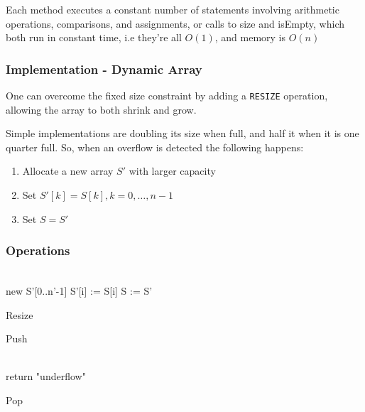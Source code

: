 				\par{Each method executes a constant number of statements involving
arithmetic operations, comparisons, and assignments, or calls to size and isEmpty,
which both run in constant time, i.e they're all $O(1)$, and memory is $O(n)$}

		\subsubsection{Implementation - Dynamic Array}

				\par{One can overcome the fixed size constraint by adding a \texttt{RESIZE} operation, allowing the array to both shrink and grow.}
				\par{Simple implementations are doubling its size when full, and half it when it is one quarter full. So, when an overflow is detected the following happens:}
				\begin{enumerate}
						\item Allocate a new array $S'$ with larger capacity
						\item Set $S'[k] = S[k] , k = 0 , \dots , n-1$
						\item Set $S = S'$
				\end{enumerate}

		\subsubsection{Operations}
						\begin{algorithm}[H]
				\DontPrintSemicolon
				\SetAlgoLined{}
				\\
				\Indp new S’[0..n’-1] \;
					{S’[i] := S[i]}
				S := S'
				\caption{Resize}

			\end{algorithm}

			\begin{algorithm}[H]
				\DontPrintSemicolon
				\SetAlgoLined{}
				\caption{Push}

			\end{algorithm}

		\begin{algorithm}[H]
				\DontPrintSemicolon
				\SetAlgoLined{}
				\\
					{return "underflow"}

				\caption{Pop}

			\end{algorithm}

